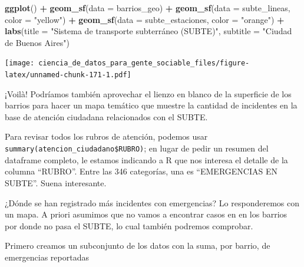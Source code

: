 \documentclass[spanish,]{book}
\newenvironment{Shaded}{\begin{snugshade}}{\end{snugshade}}
\newcommand{\DataTypeTok}[1]{\textcolor[rgb]{0.13,0.29,0.53}{#1}}
\newcommand{\KeywordTok}[1]{\textcolor[rgb]{0.13,0.29,0.53}{\textbf{#1}}}
\newcommand{\NormalTok}[1]{#1}
\newcommand{\OperatorTok}[1]{\textcolor[rgb]{0.81,0.36,0.00}{\textbf{#1}}}
\newcommand{\StringTok}[1]{\textcolor[rgb]{0.31,0.60,0.02}{#1}}
\begin{document}
\begin{Shaded}
\begin{Highlighting}[]
\KeywordTok{ggplot}\NormalTok{() }\OperatorTok{+}
\StringTok{    }\KeywordTok{geom_sf}\NormalTok{(}\DataTypeTok{data =}\NormalTok{ barrios_geo) }\OperatorTok{+}
\StringTok{    }\KeywordTok{geom_sf}\NormalTok{(}\DataTypeTok{data =}\NormalTok{ subte_lineas, }\DataTypeTok{color =} \StringTok{"yellow"}\NormalTok{) }\OperatorTok{+}
\StringTok{    }\KeywordTok{geom_sf}\NormalTok{(}\DataTypeTok{data =}\NormalTok{ subte_estaciones, }\DataTypeTok{color =} \StringTok{"orange"}\NormalTok{) }\OperatorTok{+}
\StringTok{    }\KeywordTok{labs}\NormalTok{(}\DataTypeTok{title =} \StringTok{"Sistema de transporte subterráneo (SUBTE)"}\NormalTok{,}
         \DataTypeTok{subtitle =} \StringTok{"Ciudad de Buenos Aires"}\NormalTok{)}
\end{Highlighting}
\end{Shaded}

\texttt{[image: ciencia\_de\_datos\_para\_gente\_sociable\_files/figure-latex/unnamed-chunk-171-1.pdf]}

¡Voilà! Podríamos también aprovechar el lienzo en blanco de la superficie de los barrios para hacer un mapa temático que muestre la cantidad de incidentes en la base de atención ciudadana relacionados con el SUBTE.

Para revisar todos los rubros de atención, podemos usar \texttt{summary(atencion\_ciudadano\$RUBRO)}; en lugar de pedir un resumen del dataframe completo, le estamos indicando a R que nos interesa el detalle de la columna ``RUBRO''. Entre las 346 categorías, una es ``EMERGENCIAS EN SUBTE''. Suena interesante.

¿Dónde se han registrado más incidentes con emergencias? Lo responderemos con un mapa. A priori asumimos que no vamos a encontrar casos en en los barrios por donde no pasa el SUBTE, lo cual también podremos comprobar.

Primero creamos un subconjunto de los datos con la suma, por barrio, de emergencias reportadas

\begin{Shaded}
\end{Shaded}
\end{document}
